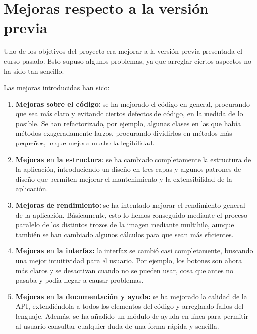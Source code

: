 


\section{Mejoras respecto a la versión previa}
Uno de los objetivos del proyecto era mejorar a la versión previa presentada el curso pasado. Esto supuso algunos problemas, ya que arreglar ciertos aspectos no ha sido tan sencillo.

Las mejoras introducidas han sido:

\begin{enumerate}

\item \textbf{Mejoras sobre el código:} se ha mejorado el código en general, procurando que sea más claro y evitando ciertos defectos de código, en la medida de lo posible. Se han refactorizado, por ejemplo, algunas clases en las que había métodos exageradamente largos, procurando dividirlos en métodos más pequeños, lo que mejora mucho la legibilidad.

\item \textbf{Mejoras en la estructura:} se ha cambiado completamente la estructura de la aplicación, introduciendo un diseño en tres capas y algunos patrones de diseño que permiten mejorar el mantenimiento y la extensibilidad de la aplicación.

\item \textbf{Mejoras de rendimiento:} se ha intentado mejorar el rendimiento general de la aplicación. Básicamente, esto lo hemos conseguido mediante el proceso paralelo de los distintos trozos de la imagen mediante multihilo, aunque también se han cambiado algunos cálculos para que sean más eficientes.

\item \textbf{Mejoras en la interfaz:} la interfaz se cambió casi completamente, buscando una mejor intuitividad para el usuario. Por ejemplo, los botones son ahora más claros y se desactivan cuando no se pueden usar, cosa que antes no pasaba y podía llegar a causar problemas.

\item \textbf{Mejoras en la documentación y ayuda:} se ha mejorado la calidad de la API, extendiéndola a todos los elementos del código y arreglando fallos del lenguaje. Además, se ha añadido un módulo de ayuda en línea para permitir al usuario consultar cualquier duda de una forma rápida y sencilla.


\end{enumerate}
